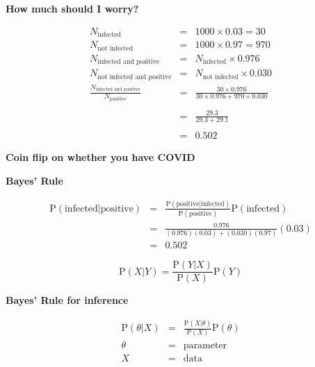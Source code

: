 \documentclass[titlepage,landscape,pdftex]{seminar}
\newcommand{\heading}[1]{{\color{red}\large\bf#1}}
\begin{document}
\begin{slide}
  \heading{How much should I worry?}

  {\small
    \begin{eqnarray*}
      N_{\mbox{infected}} &=& 1000 \times 0.03  = 30 \\
      N_{\mbox{not infected}} & = & 1000 \times 0.97 = 970 \\
      N_{\mbox{infected and positive}} &=& N_{\mbox{infected}}\times
                                           0.976 \\
      N_{\mbox{not infected and positive}} &=&
        N_{\mbox{not infected}}\times 0.030 \\
      \frac{N_{\mbox{infected and positive}}}{N_{\mbox{{positive}}}} &=&
        \frac{30\times 0.976}{30\times 0.976 + 970\times 0.030} \\
      \\
        &=& \frac{29.3}{29.3 + 29.1} \\
      \\
        &=& 0.502
    \end{eqnarray*}
  }

  {\color{red}\bf
    Coin flip on whether you have COVID}
  \vfill
  
\end{slide}

\begin{slide}
  \heading{Bayes' Rule}

  \begin{eqnarray*}
  \mbox{P}(\mbox{infected}|\mbox{positive}) &=&
  \frac{\mbox{P}(\mbox{positive}|\mbox{infected})}
            {\mbox{P}(\mbox{positive})}\mbox{P}(\mbox{infected}) \\
    &=& \frac{0.976}{(0.976)(0.03) + (0.030)(0.97)}(0.03) \\
    &=& 0.502
    \end{eqnarray*}


  $$
  \mbox{P}(X|Y) = \frac{\mbox{P}(Y|X)}{\mbox{P}(X)}\mbox{P}(Y)
  $$

    \vfill

\end{slide}

\begin{slide}
  \heading{Bayes' Rule for inference}

  \begin{eqnarray*}
    \mbox{P}(\theta|X) &=&
      \frac{\mbox{P}(X|\theta)}{\mbox{P}(X)}\mbox{P}(\theta) \\
    \theta &=& \mbox{parameter} \\
    X &=& \mbox{data}             
  \end{eqnarray*}

  \vfill
  
\end{slide}
\end{document}
